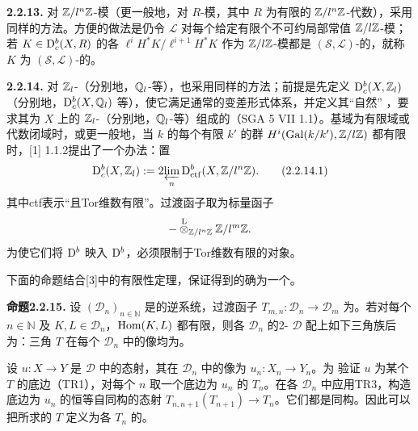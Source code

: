\par\medskip\noindent\textbf{2.2.13.} 对 $\mathbb Z/l^n\mathbb Z$-模（更一般地，对 $R$-模，其中 $R$ 为有限的 $\mathbb Z/l^n\mathbb Z$-代数），采用同样的方法。方便的做法是仍令 $\mathcal L$ 对每个给定有限个不可约局部常值 $\mathbb Z/l\mathbb Z$-模；若 $K\in\mathrm{D}_c^b(X,R)$ 的各 $\ell^iH^*K/\ell^{i+1}H^*K$ 作为 $\mathbb Z/l\mathbb Z$-模都是 $(\mathcal S,\mathcal L)$-的，就称 $K$ 为 $(\mathcal S,\mathcal L)$-的。

\par\medskip\noindent\textbf{2.2.14.} 对 $\mathbb Z_l$-（分别地，$\mathbb Q_l$-等），也采用同样的方法；前提是先定义 $\mathrm{D}_c^b(X,\mathbb Z_l)$（分别地，$\mathrm{D}_c^b(X,\mathbb Q_l)$ 等），使它满足通常的变差形式体系，并定义其“自然” ，要求其为 $X$ 上的 $\mathbb Z_l$-（分别地，$\mathbb Q_l$-等）组成的（SGA 5 VII 1.1）。基域为有限域或代数闭域时，或更一般地，当 $k$ 的每个有限 $k'$ 的群 $H^i(\operatorname{Gal}(\relax k/k'),\mathbb Z/l\mathbb Z)$ 都有限时，[1] 1.1.2提出了一个办法：置
\begin{equation*}
 \mathrm{D}_c^b(X,\mathbb Z_l):=2\!\varprojlim_n\mathrm{D}_{\mathrm{ctf}}^b(X,\mathbb Z/l^n\mathbb Z).\tag{2.2.14.1}
\end{equation*}
其中ctf表示“且Tor维数有限”。过渡函子取为标量函子
\[
 -\mathbin{\overset{\mathrm L}{\otimes}}_{\mathbb Z/l^n\mathbb Z}\mathbb Z/l^m\mathbb Z.
\]
为使它们将 $\mathrm{D}^b$ 映入 $\mathrm{D}^b$，必须限制于Tor维数有限的对象。

下面的命题结合[3]中的有限性定理，保证得到的确为一个。

\par\medskip\noindent\textbf{命题2.2.15.} 设 $(\mathcal D_n)_{n\in\mathbb N}$ 是的逆系统，过渡函子 $T_{m,n}\colon\mathcal D_n\to\mathcal D_m$ 为。若对每个 $n\in\mathbb N$ 及 $K,L\in\mathcal D_n$，$\operatorname{Hom}(K,L)$ 都有限，则各 $\mathcal D_n$ 的2- $\mathcal D$ 配上如下三角族后为：三角 $T$ 在每个 $\mathcal D_n$ 中的像均为。

设 $u\colon X\to Y$ 是 $\mathcal D$ 中的态射，其在 $\mathcal D_n$ 中的像为 $u_n\colon X_n\to Y_n$。为
验证 $u$ 为某个 $T$ 的底边（TR1），对每个 $n$ 取一个底边为 $u_n$ 的 $T_n$。在各 $\mathcal D_n$ 中应用TR3，构造底边为 $u_n$ 的恒等自同构的态射 $T_{n,n+1}(T_{n+1})\to T_n$。它们都是同构。因此可以把所求的 $T$ 定义为各 $T_n$ 的。

